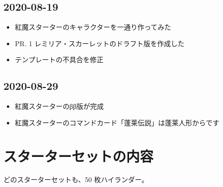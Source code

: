 \documentclass[line_length=22zw,number_of_lines=45,twocolumn]{jlreq}
\begin{document}
\subsection{2020-08-19}
\begin{itemize}
	\item 紅魔スターターのキャラクターを一通り作ってみた
	\item PR. 1 レミリア・スカーレットのドラフト版を作成した
	\item テンプレートの不具合を修正
\end{itemize}

\subsection{2020-08-29}
\begin{itemize}
	\item 紅魔スターターのββ版が完成
	\item 紅魔スターターのコマンドカード「蓬莱伝説」は蓬莱人形からです
\end{itemize}

\section{スターターセットの内容}
どのスターターセットも、50 枚ハイランダー。
\clearpage\small
\end{document}
